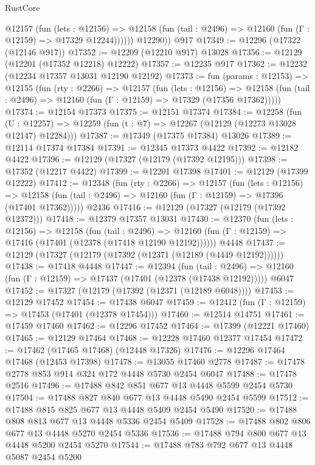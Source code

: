 \begin{lexlean}{RustCore}
\begin{coremodule}
            @12157
              (fun (lets : @12156) =>
              @12158 (fun (tail : @2496) => @12160 (fun (Γ : @12159) => @17329 @12244))))))
        @12290))
    @917
@17349 := @12296 (@17322 (@12146 @917))
@17352 := @12209 (@12210 @917) @13028
@17356 := @12129 (@12201 (@17352 @12218) @12222)
@17357 := @12235 @917
@17362 := @12232 (@12234 @17357 @13031 @12190 @12192)
@17373 := fun (params : @12153) =>
  @12155
    (fun (rty : @2266) =>
    @12157
      (fun (lets : @12156) =>
      @12158 (fun (tail : @2496) => @12160 (fun (Γ : @12159) => @17329 (@17356 @17362)))))
@17374 := @12154 @17373
@17375 := @12151 @17374
@17384 := @12258
    (fun (U : @12257) => @12259 (fun (t : @7) => @12267 (@12129 (@12273 @13028 @12147) @12284)))
@17387 := @17349 (@17375 @17384) @13026
@17389 := @12114 @17374 @17384
@17391 := @12345 @17373 @4422
@17392 := @12182 @4422
@17396 := @12129 (@17327 (@12179 (@17392 @12195)))
@17398 := @17352 (@12217 @4422)
@17399 := @12201 @17398
@17401 := @12129 (@17399 @12222)
@17412 := @12348
    (fun (rty : @2266) =>
    @12157
      (fun (lets : @12156) =>
      @12158 (fun (tail : @2496) => @12160 (fun (Γ : @12159) => @17396 (@17401 @17362)))))
    @2436
@17416 := @12129 (@17327 (@12179 (@17392 @12372)))
@17418 := @12379 @17357 @13031
@17430 := @12370
    (fun (lets : @12156) =>
    @12158
      (fun (tail : @2496) =>
      @12160 (fun (Γ : @12159) => @17416 (@17401 (@12378 (@17418 @12190 @12192))))))
    @4448
@17437 := @12129 (@17327 (@12179 (@17392 (@12371 (@12189 (@4449 @12192))))))
@17438 := @17418 @4448
@17447 := @12394
    (fun (tail : @2496) => @12160 (fun (Γ : @12159) => @17437 (@17401 (@12378 (@17438 @12192)))))
    @6047
@17452 := @17327 (@12179 (@17392 (@12371 (@12189 @6048))))
@17453 := @12129 @17452
@17454 := @17438 @6047
@17459 := @12412 (fun (Γ : @12159) => @17453 (@17401 (@12378 @17454)))
@17460 := @12514 @14751
@17461 := @17459 @17460
@17462 := @12296 @17452
@17464 := @17399 (@12221 @17460)
@17465 := @12129 @17464
@17468 := @12228 @17460 @12377 @17454
@17472 := @17462 (@17465 @17468) (@12448 @17326)
@17476 := @12296 @17464 @17468 (@12453 @17398)
@17478 := @13055 @17460 @2778
@17487 := @17478 @2778 @853 @914 @324 @172 @4448 @5730 @2454 @6047
@17488 := @17478 @2516
@17496 := @17488 @842 @851 @677 @13 @4448 @5599 @2454 @5730
@17504 := @17488 @827 @840 @677 @13 @4448 @5490 @2454 @5599
@17512 := @17488 @815 @825 @677 @13 @4448 @5409 @2454 @5490
@17520 := @17488 @808 @813 @677 @13 @4448 @5336 @2454 @5409
@17528 := @17488 @802 @806 @677 @13 @4448 @5270 @2454 @5336
@17536 := @17488 @794 @800 @677 @13 @4448 @5200 @2454 @5270
@17544 := @17488 @783 @792 @677 @13 @4448 @5087 @2454 @5200

\end{coremodule}
\end{lexlean}

